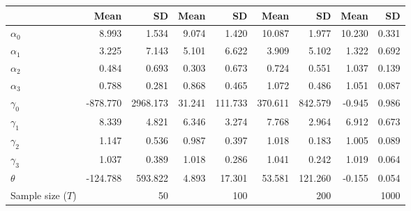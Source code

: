 
\begin{tabular}[t]{lrrrrrrrr}
\toprule
  & Mean & SD & Mean  & SD  & Mean   & SD   & Mean    & SD   \\
\midrule
$\alpha_{0}$ & 8.993 & 1.534 & 9.074 & 1.420 & 10.087 & 1.977 & 10.230 & 0.331\\
$\alpha_{1}$ & 3.225 & 7.143 & 5.101 & 6.622 & 3.909 & 5.102 & 1.322 & 0.692\\
$\alpha_{2}$ & 0.484 & 0.693 & 0.303 & 0.673 & 0.724 & 0.551 & 1.037 & 0.139\\
$\alpha_{3}$ & 0.788 & 0.281 & 0.868 & 0.465 & 1.072 & 0.486 & 1.051 & 0.087\\
$\gamma_{0}$ & -878.770 & 2968.173 & 31.241 & 111.733 & 370.611 & 842.579 & -0.945 & 0.986\\
$\gamma_{1}$ & 8.339 & 4.821 & 6.346 & 3.274 & 7.768 & 2.964 & 6.912 & 0.673\\
$\gamma_{2}$ & 1.147 & 0.536 & 0.987 & 0.397 & 1.018 & 0.183 & 1.005 & 0.089\\
$\gamma_{3}$ & 1.037 & 0.389 & 1.018 & 0.286 & 1.041 & 0.242 & 1.019 & 0.064\\
$\theta$ & -124.788 & 593.822 & 4.893 & 17.301 & 53.581 & 121.260 & -0.155 & 0.054\\
Sample size ($T$) &  & 50 &  & 100 &  & 200 &  & 1000\\
\bottomrule
\end{tabular}
